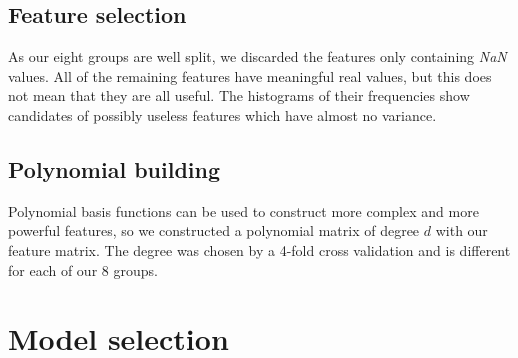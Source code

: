 \documentclass[10pt,conference,compsocconf]{IEEEtran}
\begin{document}
\subsection{Feature selection}
As our eight groups are well split, we discarded the features only containing \emph{NaN} values. All of the remaining features have meaningful real values, but this does not mean that they are all useful. The histograms of their frequencies show candidates of possibly useless features which have almost no variance. %

\subsection{Polynomial building}
Polynomial basis functions can be used to construct more complex and more powerful features, so we constructed a polynomial matrix of degree $d$ with our feature matrix. The degree was chosen by a 4-fold cross validation and is different for each of our 8 groups.

\section{Model selection}

\end{document}
